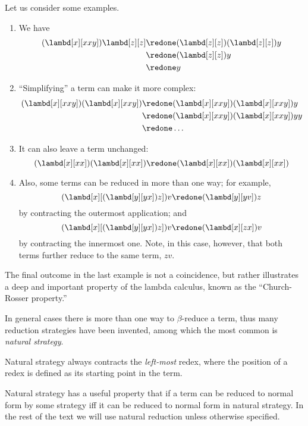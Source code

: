 \documentclass[../../../include/open-logic-section]{subfiles}
\begin{document}
Let us consider some examples.
\begin{enumerate}
\item We have
\begin{align*}
(\lambd[x][xxy]) \lambd[z][z] & \redone (\lambd[z][z])(\lambd[z][z]) y \\
& \redone (\lambd[z][z]) y \\
& \redone y
\end{align*}
\item ``Simplifying'' a term can make it more complex:
\begin{align*}
(\lambd[x][xxy])(\lambd[x][xxy]) & \redone (\lambd[x][xxy])(\lambd[x][xxy])y \\
& \redone (\lambd[x][xxy])(\lambd[x][xxy])yy \\
& \redone \dots
\end{align*}
\item It can also leave a term unchanged:
\[
(\lambd[x][xx])(\lambd[x][xx]) \redone (\lambd[x][xx])(\lambd[x][xx])
\]
\item Also, some terms can be reduced in more than one way; for
  example,
\[
(\lambd[x][(\lambd[y][yx]) z]) v \redone (\lambd[y][yv]) z
\]
by contracting the outermost application; and
\[
(\lambd[x][(\lambd[y][yx]) z]) v \redone (\lambd[x][zx]) v
\]
by contracting the innermost one. Note, in this case, however, that
both terms further reduce to the same term, $zv$.
\end{enumerate}

The final outcome in the last example is not a coincidence, but rather
illustrates a deep and important property of the lambda calculus, known as the
``Church-Rosser property.''

\begin{digress}
  In general cases there is more than one way to $\beta$-reduce a
  term, thus many reduction strategies have been invented, among which
  the most common is \emph{natural strategy}.
  
  Natural strategy always contracts the \emph{left-most}
  redex, where the position of a redex is defined as its starting
  point in the term.

  Natural strategy has a useful property that if a term can be reduced
  to normal form by some strategy iff it can be reduced to normal form in
  natural strategy. In the rest of the text we will use natural
  reduction unless otherwise specified. 
\end{digress}
\end{document}
